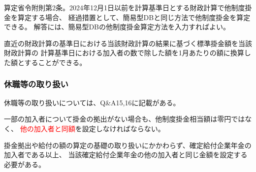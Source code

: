 \begin{itembox}[l]{}
  算定省令附則第2条。2024年12月1日以前を計算基準日とする財政計算で他制度掛金を算定する場合、
  経過措置として、簡易型DBと同じ方法で他制度掛金を算定できる。
  解答には、簡易型DBの他制度掛金算定方法を入力すればよい。
\end{itembox}

\begin{sol}
  \;

  直近の財政計算の基準日における当該財政計算の結果に基づく標準掛金額を当該財政計算の
  計算基準日における加入者の数で除した額を1月あたりの額に換算した額とすることができる。
\end{sol}

\newpage

\subsubsection{休職等の取り扱い}

\begin{itembox}[l]{}
  休職等の取り扱いについては、Q\&A15,16に記載がある。

  一部の加入者について掛金の拠出がない場合も、他制度掛金相当額は零円ではなく、
  \textcolor{red}{他の加入者と同額}を設定しなければならない。
\end{itembox}

\begin{sol}
  \;

  掛金拠出や給付の額の算定の基礎の取り扱いにかかわらず、確定給付企業年金の加入者である以上、
  当該確定給付企業年金の他の加入者と同じ金額を設定する必要がある。
\end{sol}

\newpage